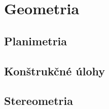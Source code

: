 \chapter{Geometria}
\label{chap:geom}

\section{Planimetria}

\section{Konštrukčné úlohy}

\section{Stereometria}